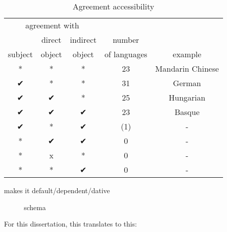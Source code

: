  \begin{table}[H]
   \center
   \caption {Agreement accessibility}
     \begin{tabular}[t]{ccccc}
       \toprule
             \multicolumn{3}{c}{agreement with}
             &
           & \\
       \cmidrule{1-3}
             & direct
             & indirect
             & number
           & \\
             subject
             & object
             & object
             & of languages
           & example \\
       \cmidrule{1-3} \cmidrule{4-4} \cmidrule{5-5}
             *
             & *
             & *
             & 23
           & Mandarin Chinese \\
             ✔
             & *
             & *
             & 31
           & German \\
             ✔
             & ✔
             & *
             & 25
           & Hungarian \\
             ✔
             & ✔
             & ✔
             & 23
           & Basque \\
             ✔
             & *
             & ✔
             & (1)
           & - \\
             {*}
             & ✔
             & ✔
             & 0
           & - \\
             {*}
             & x
             & *
             & 0
           & - \\
             {*}
             & *
             & ✔
             & 0
           & - \\
       \bottomrule
     \end{tabular}
 \end{table}

\citealt{bobaljik2006} makes it default/dependent/dative

\begin{figure}[H]
  \centering
  \caption{ schema}
  \label{fig:defdepdat}
\end{figure}

For this dissertation, this translates to this:

